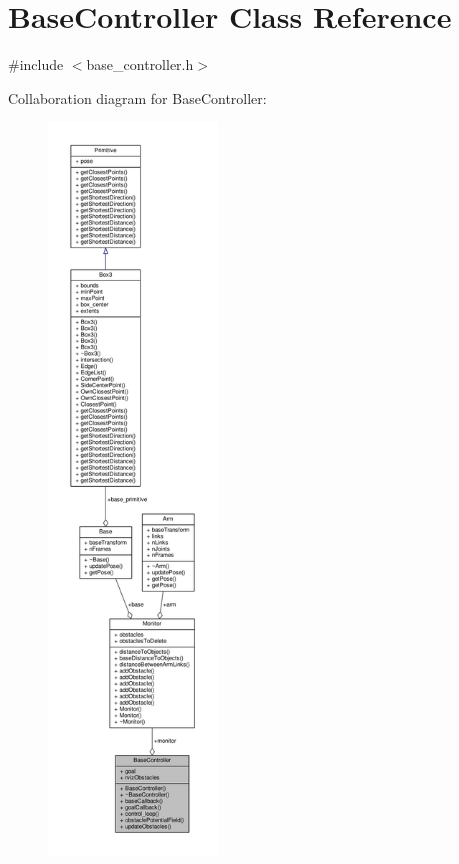 \hypertarget{class_base_controller}{}\section{Base\+Controller Class Reference}
\label{class_base_controller}


{\ttfamily \#include $<$base\+\_\+controller.\+h$>$}



Collaboration diagram for Base\+Controller\+:
\nopagebreak
\begin{figure}[H]
\begin{center}
\leavevmode
\includegraphics[height=550pt]{class_base_controller__coll__graph}
\end{center}
\end{figure}
